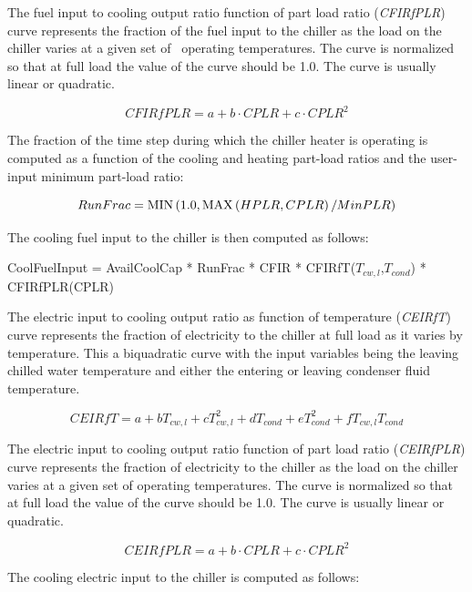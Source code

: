 The fuel input to cooling output ratio function of part load ratio (\emph{CFIRfPLR}) curve represents the fraction of the fuel input to the chiller as the load on the chiller varies at a given set of~ operating temperatures. The curve is normalized so that at full load the value of the curve should be 1.0. The curve is usually linear or quadratic.

\begin{equation}
CFIRfPLR = a + b \cdot CPLR + c \cdot CPL{R^2}
\end{equation}

The fraction of the time step during which the chiller heater is operating is computed as a function of the cooling and heating part-load ratios and the user-input minimum part-load ratio:

\begin{equation}
RunFrac = {\mathop{\rm MIN}\nolimits} \left( {1.0,{\mathop{\rm MAX}\nolimits} \left( {HPLR,CPLR} \right)/MinPLR} \right)
\end{equation}

The cooling fuel input to the chiller is then computed as follows:

CoolFuelInput = AvailCoolCap * RunFrac * CFIR * CFIRfT($T_{cw,l}$,$T_{cond}$) * CFIRfPLR(CPLR)

The electric input to cooling output ratio as function of temperature (\emph{CEIRfT}) curve represents the fraction of electricity to the chiller at full load as it varies by temperature. This a biquadratic curve with the input variables being the leaving chilled water temperature and either the entering or leaving condenser fluid temperature.

\begin{equation}
CEIRfT = a + b{T_{cw,l}} + cT_{cw,l}^2 + d{T_{cond}} + eT_{cond}^2 + f{T_{cw,l}}{T_{cond}}
\end{equation}

The electric input to cooling output ratio function of part load ratio (\emph{CEIRfPLR}) curve represents the fraction of electricity to the chiller as the load on the chiller varies at a given set of operating temperatures. The curve is normalized so that at full load the value of the curve should be 1.0. The curve is usually linear or quadratic.

\begin{equation}
CEIRfPLR = a + b \cdot CPLR + c \cdot CPL{R^2}
\end{equation}

The cooling electric input to the chiller is computed as follows:

